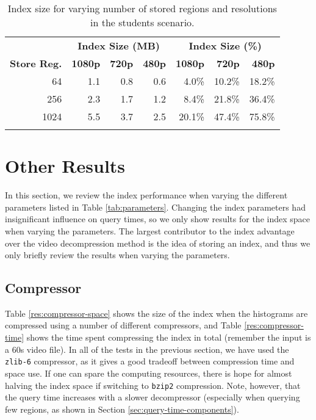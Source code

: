 \begin{table}[t]
    \caption{Index size for varying number of stored regions and resolutions in the students scenario.}\label{res:regions-stored}
	\centering
    \begin{tabular}{r rrr rrr}
		~ & \multicolumn{3}{c|}{\textbf{Index Size (MB)}} & \multicolumn{3}{c}{\textbf{Index Size (\%)}} \\
		\cline{2-7}
	    \textbf{Store Reg.} & \textbf{1080p} & \textbf{720p} & \textbf{480p} & \textbf{1080p} & \textbf{720p} & \textbf{480p} \\ \hline\noalign{\smallskip}
		64   		& 1.1 & 0.8 & 0.6 		&  4.0\% & 10.2\% & 18.2\%        \\
	    256			& 2.3 & 1.7 & 1.2 		&  8.4\% & 21.8\% & 36.4\%        \\
	    1024     	& 5.5 & 3.7 & 2.5 		& 20.1\% & 47.4\% & 75.8\%        \\\noalign{\smallskip} 
        \hline
	   \end{tabular}
\end{table}

\section{Other Results}
In this section, we review the index performance when varying the different parameters listed in Table \ref{tab:parameters}. Changing the index parameters had insignificant influence on query times, so we only show results for the index space when varying the parameters. The largest contributor to the index advantage over the video decompression method is the idea of storing an index, and thus we only briefly review the results when varying the parameters.

\subsection{Compressor}
Table \ref{res:compressor-space} shows the size of the index when the histograms are compressed using a number of different compressors, and Table \ref{res:compressor-time} shows the time spent compressing the index in total (remember the input is a 60s video file). In all of the tests in the previous section, we have used the \texttt{zlib-6} compressor, as it gives a good tradeoff between compression time and space use. If one can spare the computing resources, there is hope for almost halving the index space if switching to \texttt{bzip2} compression. Note, however, that the query time increases with a slower decompressor (especially when querying few regions, as shown in Section \ref{sec:query-time-components}).

